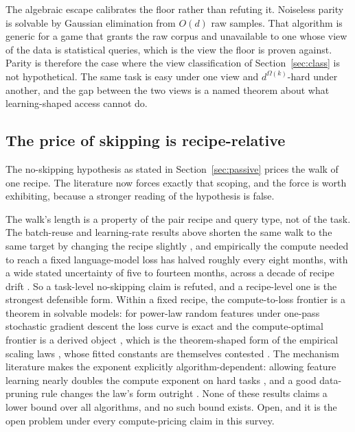 The algebraic escape calibrates the floor rather than refuting it. Noiseless
parity is solvable by Gaussian elimination from $O(d)$ raw samples. That
algorithm is generic for a game that grants the raw corpus and unavailable to
one whose view of the data is statistical queries, which is the view the floor
is proven against. Parity is therefore the case where the view classification
of Section~\ref{sec:class} is not hypothetical. The same task is easy under
one view and $d^{\Omega(k)}$-hard under another, and the gap between the two
views is a named theorem about what learning-shaped access cannot do.

\subsection{The price of skipping is recipe-relative}
\label{sec:price-skipping}

The no-skipping hypothesis as stated in Section~\ref{sec:passive} prices the
walk of one recipe. The literature now forces exactly that scoping, and the
force is worth exhibiting, because a stronger reading of the hypothesis is
false.

The walk's length is a property of the pair recipe and query type, not of the
task. The batch-reuse and learning-rate results above shorten the same walk to
the same target by changing the recipe slightly \cite{DTAPZK24,LOSW24,TME25},
and empirically the compute needed to reach a fixed language-model loss has
halved roughly every eight months, with a wide stated uncertainty of five to
fourteen months, across a decade of recipe drift \cite{HBEORGATS24}.
So a task-level no-skipping claim is refuted, and a recipe-level one is the
strongest defensible form. Within a fixed recipe, the compute-to-loss frontier
is a theorem in solvable models: for power-law random features under one-pass
stochastic gradient descent the loss curve is exact and the compute-optimal
frontier is a derived object \cite{PPXP24}, which is the theorem-shaped form of
the empirical scaling laws \cite{KMHBCCGRWA20,HBMBCRCHWCHNMDDGOSERVS22}, whose fitted constants
are themselves contested \cite{BEBY24}. The mechanism literature makes the
exponent explicitly algorithm-dependent: allowing feature learning nearly
doubles the compute exponent on hard tasks \cite{BAP25}, and a good data-pruning
rule changes the law's form outright \cite{SGSGM22}. None of these results claims
a lower bound over all algorithms, and no such bound exists. Open, and it is the
open problem under every compute-pricing claim in this survey.

